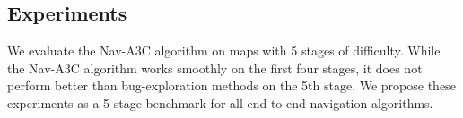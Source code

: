 \subsection{Experiments}
\label{sec:navtasks}
We evaluate the Nav-A3C algorithm on maps with 5 stages of difficulty. While the Nav-A3C algorithm works smoothly on the first four stages, it does not perform better than bug-exploration methods on the 5th stage.
We propose these experiments as a 5-stage benchmark for all end-to-end navigation algorithms.


